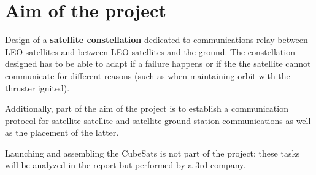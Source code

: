 \chapter{Aim of the project}
Design of a \textbf{satellite constellation} dedicated to  communications relay between LEO satellites and between LEO satellites and the ground. The constellation designed has to be able to adapt if a failure happens or if the the satellite cannot communicate for different reasons (such as when maintaining orbit with the thruster ignited).

Additionally, part of the aim of the project is to establish a communication protocol for satellite-satellite and satellite-ground station communications as well as the placement of the latter. 

Launching and assembling the CubeSats is not part of the project; these tasks will be analyzed in the report but performed by a 3rd company. 